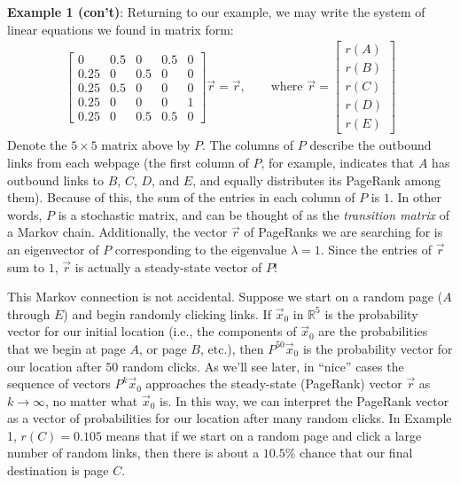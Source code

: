 \documentclass{article}
\newcommand{\R}{{\mathbb R}}    %
\begin{document}
\textbf{Example 1 (con't)}: Returning to our example, we may write the system of linear equations we found in matrix form:
\begin{align*}
  \begin{bmatrix}
    0    & 0.5 & 0   & 0.5 & 0 \\
    0.25 & 0   & 0.5 & 0   & 0 \\
    0.25 & 0.5 & 0   & 0   & 0 \\
    0.25 & 0   & 0   & 0   & 1 \\
    0.25 & 0   & 0.5 & 0.5 & 0
  \end{bmatrix} \vec{r} = \vec{r}, \qquad \text{where } \vec{r} = \begin{bmatrix}
                                                                    r(A) \\
                                                                    r(B) \\
                                                                    r(C) \\
                                                                    r(D) \\
                                                                    r(E)
                                                                  \end{bmatrix}
\end{align*}
Denote the $5 \times 5$ matrix above by $P$. The columns of $P$ describe the outbound links from each webpage (the first column of $P$, for example, indicates that $A$ has outbound links to $B$, $C$, $D$, and $E$, and equally distributes its PageRank among them). Because of this, the sum of the entries in each column of $P$ is $1$. In other words, $P$ is a stochastic matrix, and can be thought of as the \emph{transition matrix} of a Markov chain. Additionally, the vector $\vec{r}$ of PageRanks we are searching for is an eigenvector of $P$ corresponding to the eigenvalue $\lambda = 1$. Since the entries of $\vec{r}$ sum to $1$, $\vec{r}$ is actually a steady-state vector of $P$!

This Markov connection is not accidental. Suppose we start on a random page ($A$ through $E$) and begin randomly clicking links. If $\vec{x}_0$ in $\R^5$ is the probability vector for our initial location (i.e., the components of $\vec{x}_0$ are the probabilities that we begin at page $A$, or page $B$, etc.), then $P^{50}\vec{x}_0$ is the probability vector for our location after $50$ random clicks. As we'll see later, in ``nice'' cases the sequence of vectors $P^k\vec{x}_0$ approaches the steady-state (PageRank) vector $\vec{r}$ as $k \to \infty$, no matter what $\vec{x}_0$ is. In this way, we can interpret the PageRank vector as a vector of probabilities for our location after many random clicks. In Example 1, $r(C) = 0.105$ means that if we start on a random page and click a large number of random links, then there is about a $10.5\%$ chance that our final destination is page $C$.
\end{document}
